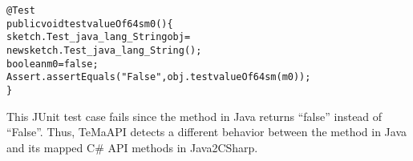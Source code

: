 \begin{CodeOut}%
\begin{alltt}
  @Test
  public void testvalueOf64sm0()\{
    sketch.Test_java_lang_String obj = 
          new sketch.Test_java_lang_String();
    boolean m0 = false;
    Assert.assertEquals("False", obj.testvalueOf64sm(m0));
  \} 
\end{alltt}
\end{CodeOut}

This JUnit test case fails since the  method in Java returns ``false'' instead of ``False''. Thus, TeMaAPI detects a different behavior between the  method in Java and its mapped C\# API methods in Java2CSharp.


